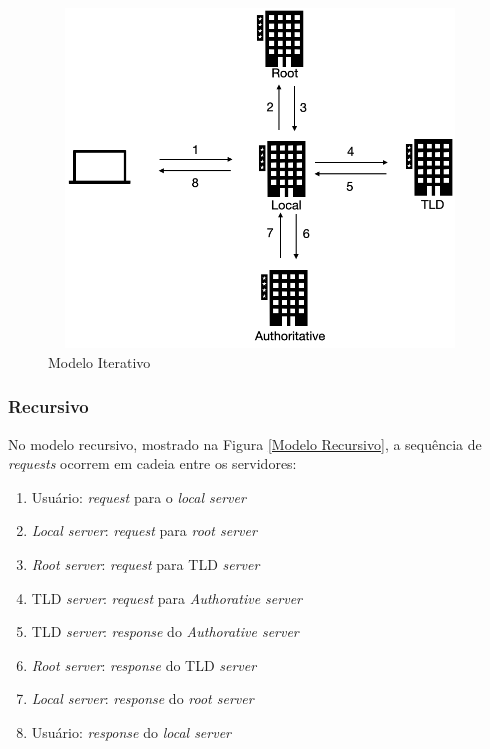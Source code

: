 \begin{figure}[H]
\centering
\includegraphics[keepaspectratio, width=12cm, height=9cm]{imagens/10/10 - modelo iterativo.png}
\caption{Modelo Iterativo \\}
\label{Modelo Iterativo}
\end{figure}



\hypertarget{recursivo}{%
\subsubsection{Recursivo}\label{recursivo}}

No modelo recursivo, mostrado na Figura \ref{Modelo Recursivo}, a sequência de \emph{requests} ocorrem em cadeia
entre os servidores:

\begin{enumerate}
\def\labelenumi{\arabic{enumi}.}
\tightlist
\item
  Usuário: \emph{request} para o \emph{local server}
\item
  \emph{Local server}: \emph{request} para \emph{root server}
\item
  \emph{Root server}: \emph{request} para TLD \emph{server}
\item
  TLD \emph{server}: \emph{request} para \emph{Authorative server}
\item
  TLD \emph{server}: \emph{response} do \emph{Authorative server}
\item
  \emph{Root server}: \emph{response} do TLD \emph{server}
\item
  \emph{Local server}: \emph{response} do \emph{root server}
\item
  Usuário: \emph{response} do \emph{local server}
\end{enumerate}


